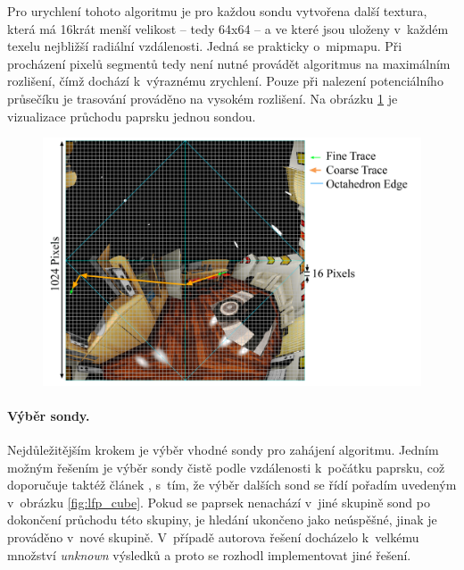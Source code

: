 Pro urychlení tohoto algoritmu je pro každou sondu vytvořena další textura, která má 16krát menší velikost -- tedy 64x64 -- a ve které jsou uloženy v~každém texelu nejbližší radiální vzdálenosti. Jedná se prakticky o~mipmapu. Při procházení pixelů segmentů tedy není nutné provádět algoritmus na maximálním rozlišení, čímž dochází k~výraznému zrychlení. Pouze při nalezení potenciálního průsečíku je trasování prováděno na vysokém rozlišení. Na obrázku \ref{fig:lfp_trace} je vizualizace průchodu paprsku jednou sondou.

\begin{figure}[H]
	\centering
	\includegraphics[scale=0.85]{images/lfp_trace.png}
	\captionsetup{justification=centering}
	\label{fig:lfp_trace}
\end{figure}

\paragraph{Výběr sondy.} Nejdůležitějším krokem je výběr vhodné sondy pro zahájení algoritmu. Jedním možným řešením je výběr sondy čistě podle vzdálenosti k~počátku paprsku, což doporučuje taktéž článek \cite{light_field_probes}, s~tím, že výběr dalších sond se řídí pořadím uvedeným v~obrázku \ref{fig:lfp_cube}. Pokud se paprsek nenachází v~jiné skupině sond po dokončení průchodu této skupiny, je hledání ukončeno jako neúspěšné, jinak je prováděno v~nové skupině. V~případě autorova řešení docházelo k~velkému množství \textit{unknown} výsledků a proto se rozhodl implementovat jiné řešení. 

